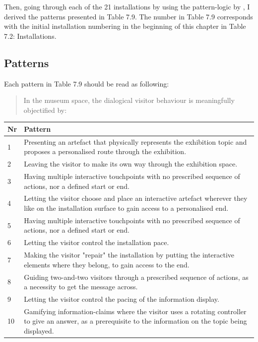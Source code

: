 \break
Then, going through each of the 21 installations by using the pattern-logic by \autocite{Alexander_book}, I derived the patterns presented in Table 7.9. The number in Table 7.9 corresponds with the initial installation numbering in the beginning of this chapter in Table 7.2: Installations.

\subsection{Patterns}
Each pattern in Table 7.9 should be read as following:

\begin{quote}
    In the museum space, the dialogical visitor behaviour is meaningfully objectified by:
\end{quote}

\begin{table}[H]
\centering
\begin{tabular}{| p{0.75cm} | p{11cm}| }
\hline
\textbf{Nr} & \textbf{Pattern}\\
\hline
1 & Presenting an artefact that physically represents the exhibition topic and proposes a personalised route through the exhibition.\\
\hline
2 & Leaving the visitor to make its own way through the exhibition space.\\
\hline
3 & Having multiple interactive touchpoints with no prescribed sequence of actions, nor a defined start or end.\\
\hline
4 & Letting the visitor choose and place an interactive artefact wherever they like on the installation surface to gain access to a personalised end.\\
\hline
5 & Having multiple interactive touchpoints with no prescribed sequence of actions, nor a defined start or end.\\
\hline
6 & Letting the visitor control the installation pace.\\
\hline
7 & Making the visitor "repair" the installation by putting the interactive elements where they belong, to gain access to the end.\\
\hline
8 & Guiding two-and-two visitors through a prescribed sequence of actions, as a necessity to get the message across.\\
\hline
9 & Letting the visitor control the pacing of the information display.\\
\hline
10 & Gamifying information-claims where the visitor uses a rotating controller to give an answer, as a prerequisite to the information on the topic being displayed.\\

\end{tabular}
\end{table}
